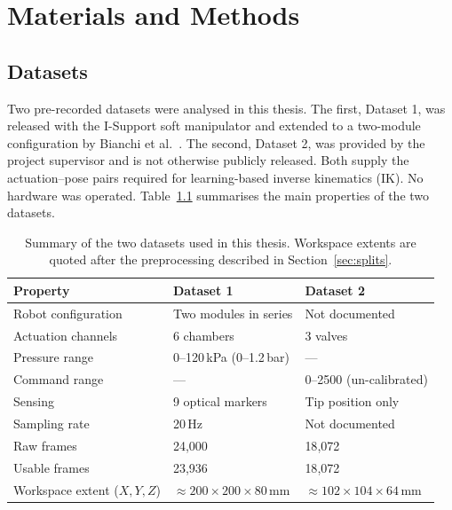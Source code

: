 \chapter{Materials and Methods}
\label{chap:methods}


\section{Datasets}
\label{sec:datasets}

Two pre-recorded datasets were analysed in this thesis. The first, Dataset 1, was released with the I-Support soft manipulator \cite{manti2016soft} and extended to a two-module configuration by Bianchi et al.\ \cite{bianchi2023learning}. The second, Dataset 2, was provided by the project supervisor and is not otherwise publicly released. Both supply the actuation--pose pairs required for learning-based inverse kinematics (IK). No hardware was operated. Table~\ref{tab:dataset_summary} summarises the main properties of the two datasets.

\begin{table}[ht]
\centering
\caption[Summary of the two datasets used in this thesis.]{Summary of the two datasets used in this thesis. Workspace extents are quoted after the preprocessing described in Section~\ref{sec:splits}.}
\label{tab:dataset_summary}
\begin{tabularx}{\linewidth}{@{}l X X@{}}
\toprule
Property & Dataset 1 & Dataset 2 \\
\midrule
Robot configuration          & Two modules in series                     & Not documented \\
Actuation channels           & 6 chambers                                & 3 valves \\
Pressure range               & 0--120\,kPa (0--1.2\,bar)                 & --- \\
Command range                & ---                                       & 0--2500 (un-calibrated) \\
Sensing                      & 9 optical markers                         & Tip position only \\
Sampling rate                & 20\,Hz                                    & Not documented \\
Raw frames                   & 24{,}000                                  & 18{,}072 \\
Usable frames                & 23{,}936                                  & 18{,}072 \\
Workspace extent ($X, Y, Z$) & $\approx 200 \times 200 \times 80$\,mm    & $\approx 102 \times 104 \times 64$\,mm \\
\bottomrule
\end{tabularx}
\end{table}

